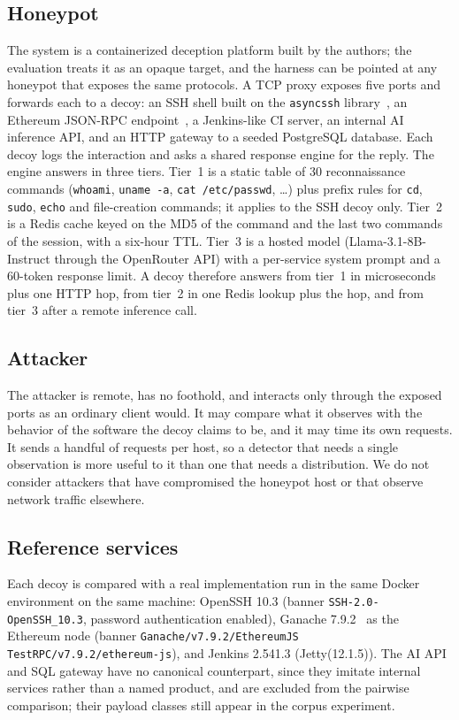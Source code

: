 \documentclass[conference]{IEEEtran}
\begin{document}
\subsection{Honeypot}
The system is a containerized deception platform built by the authors; the evaluation treats it as an opaque target, and the harness can be pointed at any honeypot that exposes the same protocols. A TCP proxy exposes five ports and forwards each to a decoy: an SSH shell built on the \texttt{asyncssh} library~\cite{ref12}, an Ethereum JSON-RPC endpoint~\cite{ref13,ref14}, a Jenkins-like CI server, an internal AI inference API, and an HTTP gateway to a seeded PostgreSQL database. Each decoy logs the interaction and asks a shared response engine for the reply. The engine answers in three tiers. Tier~1 is a static table of 30 reconnaissance commands (\texttt{whoami}, \texttt{uname -a}, \texttt{cat /etc/passwd}, \ldots) plus prefix rules for \texttt{cd}, \texttt{sudo}, \texttt{echo} and file-creation commands; it applies to the SSH decoy only. Tier~2 is a Redis cache keyed on the MD5 of the command and the last two commands of the session, with a six-hour TTL. Tier~3 is a hosted model (Llama-3.1-8B-Instruct through the OpenRouter API) with a per-service system prompt and a 60-token response limit. A decoy therefore answers from tier~1 in microseconds plus one HTTP hop, from tier~2 in one Redis lookup plus the hop, and from tier~3 after a remote inference call.

\subsection{Attacker}
The attacker is remote, has no foothold, and interacts only through the exposed ports as an ordinary client would. It may compare what it observes with the behavior of the software the decoy claims to be, and it may time its own requests. It sends a handful of requests per host, so a detector that needs a single observation is more useful to it than one that needs a distribution. We do not consider attackers that have compromised the honeypot host or that observe network traffic elsewhere.

\subsection{Reference services}
Each decoy is compared with a real implementation run in the same Docker environment on the same machine: OpenSSH 10.3 (banner \texttt{SSH-2.0-OpenSSH\_10.3}, password authentication enabled), Ganache 7.9.2~\cite{ref16} as the Ethereum node (banner \texttt{Ganache/v7.9.2/EthereumJS TestRPC/v7.9.2/ethereum-js}), and Jenkins 2.541.3 (Jetty(12.1.5)). The AI API and SQL gateway have no canonical counterpart, since they imitate internal services rather than a named product, and are excluded from the pairwise comparison; their payload classes still appear in the corpus experiment.
\end{document}
